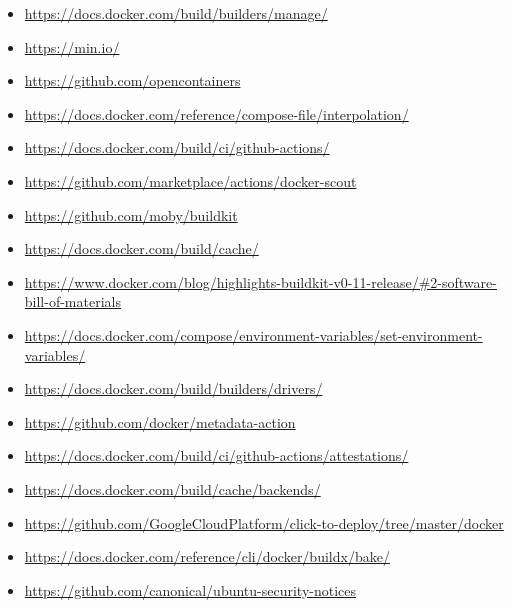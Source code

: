 \documentclass{article}
\begin{document}
\begin{itemize}
  \item \href{https://docs.docker.com/build/builders/manage/}{https://docs.docker.com/build/builders/manage/}
  \item \href{https://min.io/}{https://min.io/}
  \item \href{https://github.com/opencontainers}{https://github.com/opencontainers}
  \item \href{https://docs.docker.com/reference/compose-file/interpolation/}{https://docs.docker.com/reference/compose-file/interpolation/}
  \item \href{https://docs.docker.com/build/ci/github-actions/}{https://docs.docker.com/build/ci/github-actions/}
  \item \href{https://github.com/marketplace/actions/docker-scout}{https://github.com/marketplace/actions/docker-scout}
  \item \href{https://github.com/moby/buildkit}{https://github.com/moby/buildkit}
  \item \href{https://docs.docker.com/build/cache/}{https://docs.docker.com/build/cache/}
  \item \href{https://www.docker.com/blog/highlights-buildkit-v0-11-release/\#2-software-bill-of-materials}{https://www.docker.com/blog/highlights-buildkit-v0-11-release/\#2-software-bill-of-materials}
  \item \href{https://docs.docker.com/compose/environment-variables/set-environment-variables/}{https://docs.docker.com/compose/environment-variables/set-environment-variables/}
  \item \href{https://docs.docker.com/build/builders/drivers/}{https://docs.docker.com/build/builders/drivers/}
  \item \href{https://github.com/docker/metadata-action}{https://github.com/docker/metadata-action}
  \item \href{https://docs.docker.com/build/ci/github-actions/attestations/}{https://docs.docker.com/build/ci/github-actions/attestations/}
  \item \href{https://docs.docker.com/build/cache/backends/}{https://docs.docker.com/build/cache/backends/}
  \item \href{https://github.com/GoogleCloudPlatform/click-to-deploy/tree/master/docker}{https://github.com/GoogleCloudPlatform/click-to-deploy/tree/master/docker}
  \item \href{https://docs.docker.com/reference/cli/docker/buildx/bake/}{https://docs.docker.com/reference/cli/docker/buildx/bake/}
  \item \href{https://github.com/canonical/ubuntu-security-notices}{https://github.com/canonical/ubuntu-security-notices}

\end{itemize}
\end{document}
